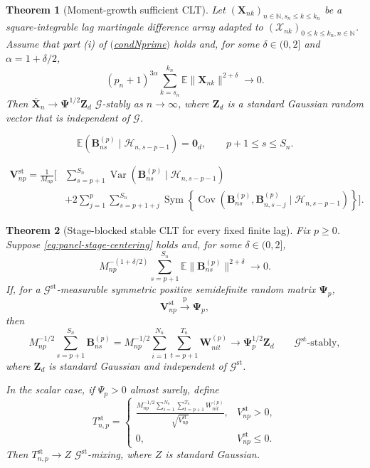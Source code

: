 \documentclass[10pt,a4paper]{amsart}
\newtheorem{theorem}{Theorem}
\DeclareMathOperator{\Cov}{Cov}
\newcommand{\E}{\mathbb{E}}
\newcommand{\G}{\mathcal{G}}
\newcommand{\Hcal}{\mathcal{H}}
\newcommand{\N}{\mathbb{N}}
\DeclareMathOperator{\Sym}{Sym}
\DeclareMathOperator{\Var}{Var}
\newcommand{\X}{\mathcal{X}}
\newcommand\mat[1]{\mathbf{#1}}
\newcommand{\pconverge}{\overset{\mathrm{p}}{\to}}
\newcommand{\refitem}[1]{$\mathrm{(}$\hyperlink{cond:#1}{\csname cond#1\endcsname}$\mathrm{)}$}
\renewcommand\vec[1]{\boldsymbol{#1}}
\begin{document}
\begin{theorem}[Moment-growth sufficient CLT]\label{thm:moment-growth-clt}
Let $(\vec{X}_{nk})_{n \in \N, s_n \leq k \leq k_n}$ be a square-integrable lag martingale difference array adapted to $(\X_{nk})_{0 \leq k \leq k_n, n \in \N}$.
Assume that part (i) of \refitem{Nprime} holds and, for some \(\delta\in(0,2]\) and \(\alpha=1+\delta/2\),
\[
(p_n+1)^{3\alpha}
\sum_{k=s_n}^{k_n}\E\|\vec{X}_{nk}\|^{2+\delta}
\to0.
\]
Then $\overline{\vec{X}}_n \to \mat{\Psi}^{1/2} \vec{Z}_d$ $\G$-stably as $n \to \infty$, where $\vec{Z}_d$ is a standard Gaussian random vector that is independent of $\G$.
\end{theorem}

\begin{equation}\label{eq:panel-stage-centering}
\E(\vec B^{(p)}_{ns}\mid\Hcal_{n,s-p-1})=\vec{0}_d,
\qquad p+1\leq s\leq S_n.
\end{equation}

\begin{equation}\label{eq:panel-block-variance}
\begin{aligned}
\mat V_{np}^{\mathrm{st}}
=\frac1{M_{np}}\Bigg[
&\sum_{s=p+1}^{S_n}
\Var(\vec B^{(p)}_{ns}\mid\Hcal_{n,s-p-1})\\
&+
2\sum_{j=1}^{p}\sum_{s=p+1+j}^{S_n}
\Sym\!\left\{
\Cov(\vec B^{(p)}_{ns},\vec B^{(p)}_{n,s-j}
\mid\Hcal_{n,s-p-1})
\right\}
\Bigg].
\end{aligned}
\end{equation}

\begin{theorem}[Stage-blocked stable CLT for every fixed finite lag]
\label{thm:panel-stage-block-clt}
Fix \(p\geq0\).
Suppose \eqref{eq:panel-stage-centering} holds and, for some \(\delta\in(0,2]\),
\begin{equation}\label{eq:panel-block-moment}
M_{np}^{-(1+\delta/2)}
\sum_{s=p+1}^{S_n}\E\|\vec B^{(p)}_{ns}\|^{2+\delta}
\longrightarrow0.
\end{equation}
If, for a \(\G^{\mathrm{st}}\)-measurable symmetric positive semidefinite random matrix \(\mat\Psi_p\),
\begin{equation}\label{eq:panel-block-variance-convergence}
\mat V_{np}^{\mathrm{st}}\pconverge\mat\Psi_p,
\end{equation}
then
\[
M_{np}^{-1/2}\sum_{s=p+1}^{S_n}\vec B^{(p)}_{ns}
=
M_{np}^{-1/2}\sum_{i=1}^{N_n}\sum_{t=p+1}^{T_n}\vec W^{(p)}_{nit}
\longrightarrow
\mat\Psi_p^{1/2}\vec Z_d
\qquad \G^{\mathrm{st}}\text{-stably},
\]
where \(\vec Z_d\) is standard Gaussian and independent of \(\G^{\mathrm{st}}\).

In the scalar case, if \(\Psi_p>0\) almost surely, define
\[
T_{n,p}^{\mathrm{st}}
=
\begin{cases}
\displaystyle
\frac{M_{np}^{-1/2}
\sum_{i=1}^{N_n}\sum_{t=p+1}^{T_n}W^{(p)}_{nit}}
{\sqrt{V_{np}^{\mathrm{st}}}},
&V_{np}^{\mathrm{st}}>0,\\[3mm]
0,&V_{np}^{\mathrm{st}}\leq0.
\end{cases}
\]
Then \(T_{n,p}^{\mathrm{st}}\to Z\) \(\G^{\mathrm{st}}\)-mixing, where \(Z\) is standard Gaussian.
\end{theorem}
\end{document}
